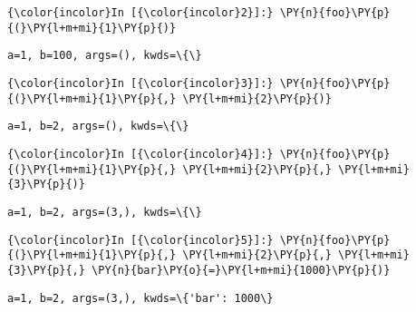     \begin{Verbatim}[commandchars=\\\{\},frame=single,framerule=0.3mm,rulecolor=\color{cellframecolor}]
{\color{incolor}In [{\color{incolor}2}]:} \PY{n}{foo}\PY{p}{(}\PY{l+m+mi}{1}\PY{p}{)}
\end{Verbatim}


    \begin{Verbatim}[commandchars=\\\{\},frame=single,framerule=0.3mm,rulecolor=\color{cellframecolor}]
a=1, b=100, args=(), kwds=\{\}
\end{Verbatim}

    \begin{Verbatim}[commandchars=\\\{\},frame=single,framerule=0.3mm,rulecolor=\color{cellframecolor}]
{\color{incolor}In [{\color{incolor}3}]:} \PY{n}{foo}\PY{p}{(}\PY{l+m+mi}{1}\PY{p}{,} \PY{l+m+mi}{2}\PY{p}{)}
\end{Verbatim}


    \begin{Verbatim}[commandchars=\\\{\},frame=single,framerule=0.3mm,rulecolor=\color{cellframecolor}]
a=1, b=2, args=(), kwds=\{\}
\end{Verbatim}

    \begin{Verbatim}[commandchars=\\\{\},frame=single,framerule=0.3mm,rulecolor=\color{cellframecolor}]
{\color{incolor}In [{\color{incolor}4}]:} \PY{n}{foo}\PY{p}{(}\PY{l+m+mi}{1}\PY{p}{,} \PY{l+m+mi}{2}\PY{p}{,} \PY{l+m+mi}{3}\PY{p}{)}
\end{Verbatim}


    \begin{Verbatim}[commandchars=\\\{\},frame=single,framerule=0.3mm,rulecolor=\color{cellframecolor}]
a=1, b=2, args=(3,), kwds=\{\}
\end{Verbatim}

    \begin{Verbatim}[commandchars=\\\{\},frame=single,framerule=0.3mm,rulecolor=\color{cellframecolor}]
{\color{incolor}In [{\color{incolor}5}]:} \PY{n}{foo}\PY{p}{(}\PY{l+m+mi}{1}\PY{p}{,} \PY{l+m+mi}{2}\PY{p}{,} \PY{l+m+mi}{3}\PY{p}{,} \PY{n}{bar}\PY{o}{=}\PY{l+m+mi}{1000}\PY{p}{)}
\end{Verbatim}


    \begin{Verbatim}[commandchars=\\\{\},frame=single,framerule=0.3mm,rulecolor=\color{cellframecolor}]
a=1, b=2, args=(3,), kwds=\{'bar': 1000\}
\end{Verbatim}

